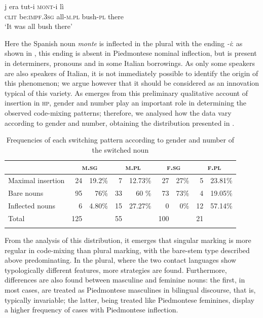\documentclass[output=paper]{langscibook}
\begin{document}
\ea%
    \label{ex:goria:12}
    \gll j era tut-i \textsc{mont}{}-i lì\\
         \textsc{clit} be:\textsc{impf}.\textsc{3sg} all-\textsc{m.pl} bush-\textsc{pl} there\\
    \glt ‘It was all bush there’
\z %

Here the Spanish noun \textit{monte} is inflected in the plural with the ending \textit{{}-i}: as shown in , this ending is absent in Piedmontese nominal inflection, but is present in determiners, pronouns and in some Italian borrowings. As only some speakers are also speakers of Italian, it is not immediately possible to identify the origin of this phenomenon; we argue however that it should be considered as an innovation typical of this variety. As emerges from this preliminary qualitative account of insertion in \textsc{hp}, gender and number play an important role in determining the observed code-mixing patterns; therefore, we analysed how the data vary according to gender and number, obtaining the distribution presented in .

\begin{table}
\begin{tabularx}{\textwidth}{X r@{~~}r r@{~~}r r@{~~}r r@{~~}r }
\lsptoprule
 & \multicolumn{2}{c}{\textsc{m.sg}} & \multicolumn{2}{c}{\textsc{m.pl}} & \multicolumn{2}{c}{\textsc{f.sg}} & \multicolumn{2}{c}{\textsc{f.pl}}\\
\midrule
{ Maximal insertion} & 24 & 19.2\% & 7 & 12.73\% & 27 & 27\% & 5 & 23.81\%\\
{ Bare nouns} & 95 & 76\% & 33 & 60 \% & 73 & 73\% & 4 & 19.05\%\\
{ Inflected nouns} & 6 & 4.80\% & 15 & 27.27\% & 0 & 0\% &  12 & 57.14\%\\
\midrule
{ Total} & 125 && 55 && 100 && 21\\
\lspbottomrule
\end{tabularx}
\caption{Frequencies of each switching pattern according to gender and number of the switched noun}
\label{tab:goria:9}
\end{table}

From the analysis of this distribution, it emerges that singular marking is more regular in code-mixing than plural marking, with the bare-stem type described above predominating. In the plural, where the two contact languages show typologically different features, more strategies are found. Furthermore, differences are also found between masculine and feminine nouns: the first, in most cases, are treated as Piedmontese masculines in bilingual discourse, that is, typically invariable; the latter, being treated like Piedmontese feminines, display a higher frequency of cases with Piedmontese inflection.
\end{document}
